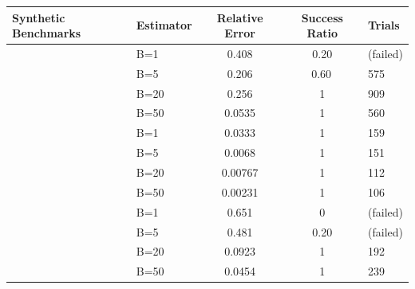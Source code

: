 \documentclass[acmsmall]{acmart}
\begin{document}



\begin{table}[t]
  \centering
  \tiny
  \begin{tabular}{@{} l l S[scientific-notation=true] S[table-format=1.2] l @{}}
    \toprule
    \textbf{Synthetic Benchmarks} & \textbf{Estimator} & \textbf{Relative Error} & \textbf{Success Ratio} & \textbf{Trials} \\
    \midrule
{} &   B=1 & \num{0.408} & \num{0.20} & (failed) \\
    & B=5      & \num{0.206} & {\num{0.60}\,}  & \num{575} \\
    &  B=20     & \num{0.256} & {1} & \num{909} \\
    &  B=50     & \num{0.0535} & {1} & \num{560} \\
    \midrule
{} &   B=1              & \num{0.0333} & {1}& \num{159} \\
    &  B=5             & \num{0.0068} & {1} & \num{151} \\
    &  B=20            & \num{0.00767} & {1} & \num{112} \\
    &  B=50            & \num{0.00231} & {1} & \num{106}  \\
    \midrule
{} &   B=1 & \num{0.651} & \num{0} & (failed) \\
    &  B=5      & \num{0.481} & \num{0.20} & (failed) \\
    &  B=20     & \num{0.0923} & {1} & \num{192} \\
    &  B=50     & \num{0.0454} & {1} & \num{239} \\
  

\end{tabular}
\end{table}
\end{document}
